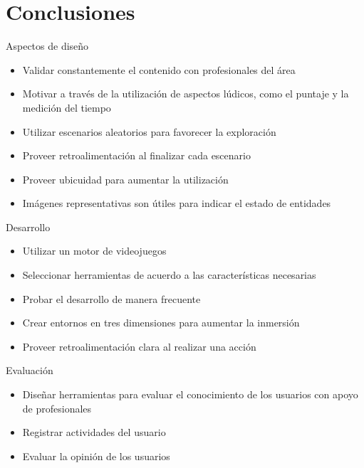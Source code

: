 \section{Conclusiones}

\begin{frame}{Aspectos de diseño}
\begin{itemize}[<+->]
    \item Validar constantemente el contenido con profesionales del área
    \item Motivar a través de la utilización de aspectos lúdicos, como el
        puntaje y la medición del tiempo
    \item Utilizar escenarios aleatorios para favorecer la exploración
    \item Proveer retroalimentación al finalizar cada escenario
    \item Proveer ubicuidad para aumentar la utilización
    \item Imágenes representativas son útiles para indicar el estado de
        entidades
\end{itemize}
\end{frame}
\begin{frame}{Desarrollo}
\begin{itemize}[<+->]
    \item Utilizar un motor de videojuegos
    \item Seleccionar herramientas de acuerdo a las características necesarias
    \item Probar el desarrollo de manera frecuente
    \item Crear entornos en tres dimensiones para aumentar la inmersión
    \item Proveer retroalimentación clara al realizar una acción
\end{itemize}
\end{frame}
\begin{frame}{Evaluación}
\begin{itemize}[<+->]
    \item Diseñar herramientas para evaluar el conocimiento de los usuarios con
        apoyo de profesionales
    \item Registrar actividades del usuario
    \item Evaluar la opinión de los usuarios
\end{itemize}
\end{frame}

